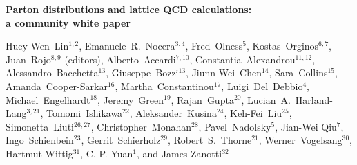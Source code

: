 \documentclass[twoside,12pt]{article}
\numberwithin{equation}{section}
\numberwithin{figure}{section}
\numberwithin{table}{section}
\begin{document}
\linenumbers
\vspace{.3cm}

\begin{center}
{\Large \bf Parton distributions and lattice QCD calculations:
\\[0.2cm] a community white paper}
\vspace{.4cm}

{\small 
  Huey-Wen~Lin$^{1,2}$,
  Emanuele~R.~Nocera$^{3,4}$,
  Fred~Olness$^5$,
  Kostas~Orginos$^{6,7}$,
  Juan~Rojo$^{8,9}$ (editors),
  Alberto~Accardi$^{7,10}$, 
  Constantia~Alexandrou$^{11,12}$, 
  Alessandro~Bacchetta$^{13}$, 
  Giuseppe~Bozzi$^{13}$, 
  Jiunn-Wei~Chen$^{14}$,
  Sara~Collins$^{15}$, 	
  Amanda~Cooper-Sarkar$^{16}$,
  Martha~Constantinou$^{17}$, 
  Luigi~Del~Debbio$^{4}$, 
  Michael~Engelhardt$^{18}$, 
  Jeremy~Green$^{19}$, 
  Rajan~Gupta$^{20}$, 
  Lucian~A.~Harland-Lang$^{3,21}$, 
  Tomomi~Ishikawa$^{22}$, 
  Aleksander~Kusina$^{24}$, 
  Keh-Fei~Liu$^{25}$, 	
  Simonetta~Liuti$^{26,27}$, 		
  Christopher~Monahan$^{28}$, 		
  Pavel~Nadolsky$^{5}$,
  Jian-Wei Qiu$^{7}$,
  Ingo~Schienbein$^{23}$, 	
  Gerrit~Schierholz$^{29}$,
  Robert~S.~Thorne$^{21}$,
  Werner~Vogelsang$^{30}$,\\
  Hartmut Wittig$^{31}$, 
  C.-P. Yuan$^{1}$, and
  James Zanotti$^{32}$
}


\end{center}
\end{document}
